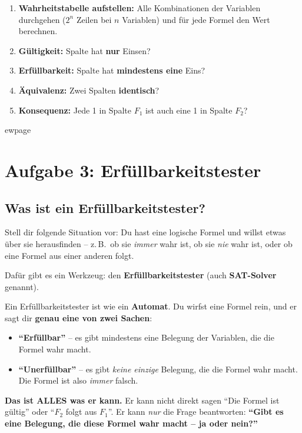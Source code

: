 \documentclass[a4paper,12pt]{article}
\begin{document}
\begin{merkbox}[title={Kochrezept: So l\"ost du solche Aufgaben}]
\begin{enumerate}
\item \textbf{Wahrheitstabelle aufstellen:} Alle Kombinationen der Variablen durchgehen ($2^n$ Zeilen bei $n$ Variablen) und f\"ur jede Formel den Wert berechnen.
\item \textbf{G\"ultigkeit:} Spalte hat \textbf{nur} Einsen?
\item \textbf{Erf\"ullbarkeit:} Spalte hat \textbf{mindestens eine} Eins?
\item \textbf{\"Aquivalenz:} Zwei Spalten \textbf{identisch}?
\item \textbf{Konsequenz:} Jede 1 in Spalte $F_1$ ist auch eine 1 in Spalte $F_2$?
\end{enumerate}
\end{merkbox}


ewpage

\section{Aufgabe 3: Erf\"ullbarkeitstester}

\subsection{Was ist ein Erf\"ullbarkeitstester?}

Stell dir folgende Situation vor: Du hast eine logische Formel und willst
etwas \"uber sie herausfinden -- z.\,B.\ ob sie \emph{immer} wahr ist,
ob sie \emph{nie} wahr ist, oder ob eine Formel aus einer anderen folgt.

Daf\"ur gibt es ein Werkzeug: den \textbf{Erf\"ullbarkeitstester}
(auch \textbf{SAT-Solver} genannt).

\begin{merkbox}
Ein Erf\"ullbarkeitstester ist wie ein \textbf{Automat}.
Du wirfst eine Formel rein, und er sagt dir \textbf{genau eine von zwei Sachen}:
\begin{itemize}
\item \textbf{"`Erf\"ullbar"'} -- es gibt mindestens eine Belegung der Variablen,
      die die Formel wahr macht.
\item \textbf{"`Unerf\"ullbar"'} -- es gibt \emph{keine einzige} Belegung,
      die die Formel wahr macht. Die Formel ist also \emph{immer} falsch.
\end{itemize}

\medskip
\textbf{Das ist ALLES was er kann.} Er kann nicht direkt sagen "`Die Formel
ist g\"ultig"' oder "`$F_2$ folgt aus $F_1$"'. Er kann \emph{nur} die Frage
beantworten: \textbf{"`Gibt es eine Belegung, die diese Formel wahr macht -- ja oder nein?"'}
\end{merkbox}
\end{document}
